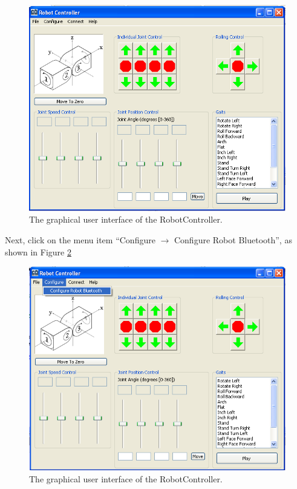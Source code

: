 \documentclass{article}
\begin{document}
\begin{figure}[H]
\begin{center}
\includegraphics[width=4.5in]{images/shot1.png}
\end{center}
\caption{\label{fig:shot1.png} The graphical user interface of the RobotController.}
\end{figure}

Next, click on the menu item ``Configure $\rightarrow$ Configure Robot Bluetooth'', as
shown in Figure \ref{fig:shot3.png}

\begin{figure}[H]
\begin{center}
\includegraphics[width=4.5in]{images/shot3.png}
\end{center}
\caption{\label{fig:shot3.png} The graphical user interface of the RobotController.}
\end{figure}
\end{document}
